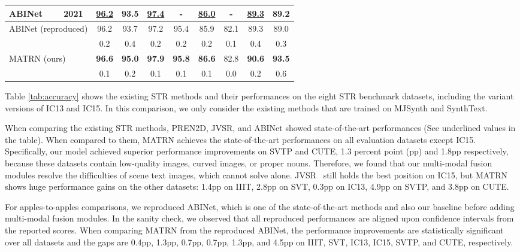 \documentclass[runningheads]{llncs}
\begin{document}
\begin{table}[t]
\begin{centering}
\begin{tabular}{ll|cccc|cccc}
 ABINet~\cite{ABINet} & 2021 & \underline{96.2} & 93.5 & \underline{97.4} & - & \underline{86.0} & - & \underline{89.3} & 89.2 \\ \midrule
 \multicolumn{2}{l|}{ABINet (reproduced)} & 96.2 & 93.7 & 97.2 & 95.4 & 85.9 & 82.1 & 89.3 & 89.0 \\
 [-0.3em] & & \scriptsize 0.2 & \scriptsize 0.4 & \scriptsize 0.2 & \scriptsize 0.2 & \scriptsize 0.2 & \scriptsize 0.1 &\scriptsize 0.4 & \scriptsize 0.3 \\
 \multicolumn{2}{l|}{MATRN (ours)} & \textbf{96.6} & \textbf{95.0} & \textbf{97.9} & \textbf{95.8} & \textbf{86.6} & 82.8 & \textbf{90.6} & \textbf{93.5} \\ [-0.3em]
 & & \scriptsize 0.1 & \scriptsize 0.2 & \scriptsize 0.1 & \scriptsize 0.1 & \scriptsize 0.1 & \scriptsize 0.0 & \scriptsize 0.2 & \scriptsize 0.6 \\
 
\bottomrule
\end{tabular}
\end{centering}
\end{table}


Table \ref{tab:accuracy} shows the existing STR methods and their performances on the eight STR benchmark datasets, including the variant versions of IC13 and IC15. 
In this comparison, we only consider the existing methods that are trained on MJSynth and SynthText.

When comparing the existing STR methods, PREN2D, JVSR, and ABINet showed state-of-the-art performances (See underlined values in the table). When compared to them, MATRN achieves the state-of-the-art performances on all evaluation datasets except IC15. Specifically, our model achieved superior performance improvements on SVTP and CUTE, 1.3 percent point (pp) and 1.8pp respectively, because these datasets contain low-quality images, curved images, or proper nouns. Therefore, we found that our multi-modal fusion modules resolve the difficulties of scene text images, which cannot solve alone. JVSR~\cite{JVSR} still holds the best position on IC15, but MATRN shows huge performance gains on the other datasets: 1.4pp on IIIT, 2.8pp on SVT, 0.3pp on IC13, 4.9pp on SVTP, and 3.8pp on CUTE.

For apples-to-apples comparisons, we reproduced ABINet, which is one of the state-of-the-art methods and also our baseline before adding multi-modal fusion modules. In the sanity check, we observed that all reproduced performances are aligned upon confidence intervals from the reported scores. When comparing MATRN from the reproduced ABINet, the performance improvements are statistically significant over all datasets and the gaps are 0.4pp, 1.3pp, 0.7pp, 0.7pp, 1.3pp, and 4.5pp on IIIT, SVT, IC13, IC15, SVTP, and CUTE, respectively.
\end{document}
